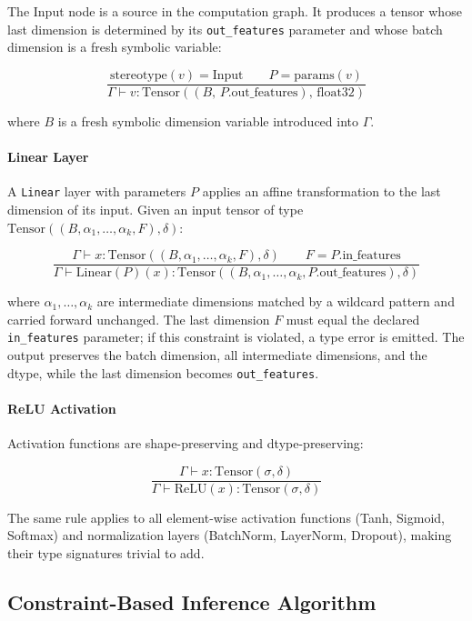 \documentclass[11pt,a4paper]{article}
\begin{document}
The Input node is a source in the computation graph. It produces a tensor whose last dimension is determined by its \texttt{out\_features} parameter and whose batch dimension is a fresh symbolic variable:

\[
	\frac{
	\text{stereotype}(v) = \text{Input}
	\qquad
	P = \text{params}(v)
	}{
	\Gamma \vdash v :
	\text{Tensor}((B,\, P.\text{out\_features}),\, \text{float32})
	}\]

where $B$ is a fresh symbolic dimension variable introduced into $\Gamma$.

\paragraph{Linear Layer}

A \texttt{Linear} layer with parameters $P$ applies an affine transformation to the last dimension of its input. Given an input tensor of type $\text{Tensor}((B, \alpha_1, \ldots, \alpha_k, F), \delta)$:

\[
	\frac{
	\Gamma \vdash x :
	\text{Tensor}((B, \alpha_1, \ldots, \alpha_k, F), \delta)
	\qquad
	F = P.\text{in\_features}
	}{
	\Gamma \vdash \text{Linear}(P)(x) :
	\text{Tensor}((B, \alpha_1, \ldots, \alpha_k, P.\text{out\_features}), \delta)
	}\]

where $\alpha_1, \ldots, \alpha_k$ are intermediate dimensions matched by a wildcard pattern and carried forward unchanged. The last dimension $F$ must equal the declared \texttt{in\_features} parameter; if this constraint is violated, a type error is emitted. The output preserves the batch dimension, all intermediate dimensions, and the dtype, while the last dimension becomes \texttt{out\_features}.

\paragraph{ReLU Activation}

Activation functions are shape-preserving and dtype-preserving:

\[
	\frac{
		\Gamma \vdash x : \text{Tensor}(\sigma, \delta)
	}{
		\Gamma \vdash \text{ReLU}(x) : \text{Tensor}(\sigma, \delta)
	}\]

The same rule applies to all element-wise activation functions (Tanh, Sigmoid, Softmax) and normalization layers (BatchNorm, LayerNorm, Dropout), making their type signatures trivial to add.

\subsection{Constraint-Based Inference Algorithm}
\end{document}
